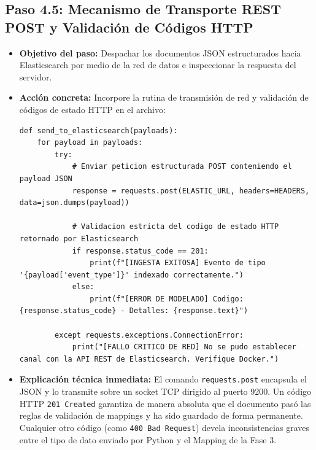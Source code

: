 \documentclass[
  coursetitle={Cómputo Nube y Tecnologías Emergentes},
  coursehours={96},
  coursedate={Verano 2026},
  doctype={Práctica},
  otherlangs={english,french},
  authorname={Lázaro},
  authorsurname={Bustio-Martínez},
  authortitle={PhD},
  role={Profesor Investigador},
  email={lbustio@inaoe.mx},
  phone={5559504000},
  ext={7459},
  institution={Instituto Nacional de Astrofísica, Óptica y Electrónica (INAOE)},
  department={Maestría en Ciencias en Tecnologías de Seguridad},
  address={Luis Enrique Erro 1, Sta. Ma. Tonantzintla, San Andrés Cholula, CP 72840, Puebla, México},
  margin={0.5in}
]{../../lbustio_lecture_notes}
\begin{document}
\subsection{Paso 4.5: Mecanismo de Transporte REST POST y Validación de Códigos HTTP}
\begin{itemize}
    \item \textbf{Objetivo del paso:} Despachar los documentos JSON estructurados hacia Elasticsearch por medio de la red de datos e inspeccionar la respuesta del servidor.
    \item \textbf{Acción concreta:} Incorpore la rutina de transmisión de red y validación de códigos de estado HTTP en el archivo:
\begin{verbatim}
def send_to_elasticsearch(payloads):
    for payload in payloads:
        try:
            # Enviar peticion estructurada POST conteniendo el payload JSON
            response = requests.post(ELASTIC_URL, headers=HEADERS, data=json.dumps(payload))
            
            # Validacion estricta del codigo de estado HTTP retornado por Elasticsearch
            if response.status_code == 201:
                print(f"[INGESTA EXITOSA] Evento de tipo '{payload['event_type']}' indexado correctamente.")
            else:
                print(f"[ERROR DE MODELADO] Codigo: {response.status_code} - Detalles: {response.text}")
                
        except requests.exceptions.ConnectionError:
            print("[FALLO CRITICO DE RED] No se pudo establecer canal con la API REST de Elasticsearch. Verifique Docker.")
\end{verbatim}
    \item \textbf{Explicación técnica inmediata:} El comando \texttt{requests.post} encapsula el JSON y lo transmite sobre un socket TCP dirigido al puerto 9200. Un código HTTP \texttt{201 Created} garantiza de manera absoluta que el documento pasó las reglas de validación de mappings y ha sido guardado de forma permanente. Cualquier otro código (como \texttt{400 Bad Request}) devela inconsistencias graves entre el tipo de dato enviado por Python y el Mapping de la Fase 3.
\end{itemize}
\end{document}
